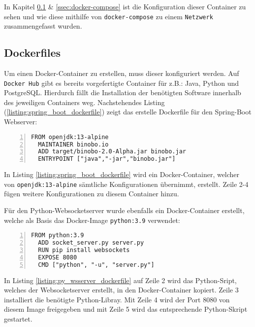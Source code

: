 \documentclass[paper=a4,12pt]{scrreprt}
\begin{document}
In Kapitel \ref{ssec:dockerfiles} \& \ref{ssec:docker-compose} ist die Konfiguration dieser Container zu sehen und wie diese mithilfe von \texttt{docker-compose} zu einem \texttt{Netzwerk} zusammengefasst wurden.\newline

\subsection{Dockerfiles}
\label{ssec:dockerfiles}

Um einen Docker-Container zu erstellen, muss dieser konfiguriert werden. Auf \texttt{Docker Hub} gibt es bereits vorgefertigte Container für z.B.: Java, Python und PostgreSQL. Hierdurch fällt die Installation der benötigten Software innerhalb des jeweiligen Containers weg.\newline
Nachstehendes Listing (\ref{listing:spring_boot_dockerfile}) zeigt das erstelle Dockerfile für den Spring-Boot Webserver:\newline

\begin{lstlisting}[caption={dockerfile: Spring-Boot Webserver}, captionpos=b, label={listing:spring_boot_dockerfile},  numbers=left, stepnumber=1]
  FROM openjdk:13-alpine
  MAINTAINER binobo.io
  ADD target/binobo-2.0-Alpha.jar binobo.jar
  ENTRYPOINT ["java","-jar","binobo.jar"]
\end{lstlisting}

In Listing \ref{listing:spring_boot_dockerfile} wird ein Docker-Container, welcher von \texttt{openjdk:13-alpine} sämtliche Konfigurationen übernimmt, erstellt. Zeile 2-4 fügen weitere Konfigurationen zu diesem Container hinzu.\newline

Für den Python-Websocketserver wurde ebenfalls ein Docker-Container erstellt, welche als Basis das Docker-Image \texttt{python:3.9} verwendet:\newline
\begin{lstlisting}[caption={dockerfile: Python Websocketserver}, captionpos=b, label={listing:py_wsserver_dockerfile},  numbers=left, stepnumber=1]
  FROM python:3.9
  ADD socket_server.py server.py
  RUN pip install websockets
  EXPOSE 8080
  CMD ["python", "-u", "server.py"]
\end{lstlisting}

In Listing \ref{listing:py_wsserver_dockerfile} auf Zeile 2 wird das Python-Sript, welches der Websocketserver erstellt, in den Docker-Container kopiert. Zeile 3 installiert die benötigte Python-Libray. Mit Zeile 4 wird der Port 8080 von diesem Image freigegeben und mit Zeile 5 wird das entsprechende Python-Skript gestartet.\newline
\end{document}
